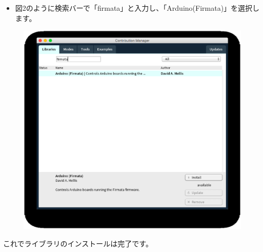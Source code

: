 \documentclass[11pt,a4paper]{jarticle}
\begin{document}
\newpage

\begin{itemize}
\item 図2のように検索バーで「firmata」と入力し、「Arduino(Firmata)」を選択します。
\end{itemize}

\begin{figure}[htbp]
  \centering
  \includegraphics[width=0.75\columnwidth]{img/eps/how_to_install_the_Firmata_library2.eps}
  \label{figure:switch}
\end{figure}

これでライブラリのインストールは完了です。



\end{document}
